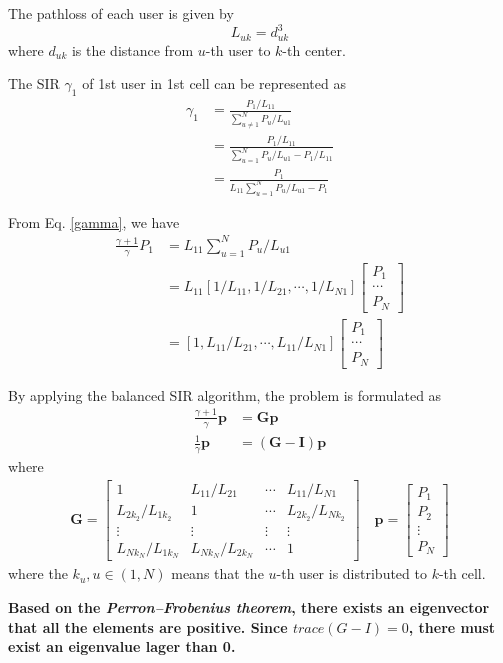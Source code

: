 \documentclass[12pt]{article}
\begin{document}
The pathloss of each user is given by
\begin{equation}
L_{uk} = d_{uk}^3
\end{equation}
where $d_{uk}$ is the distance from $u$-th user to $k$-th center.

The SIR $\gamma_1$ of 1st user in 1st cell can be represented as
\begin{align}\label{gamma}
	\gamma_1 &= \frac{P_1/L_{11}}{\sum_{u\neq 1}^{N}P_{u}/L_{u1}} \nonumber\\
	&= \frac{P_1/L_{11}}{\sum_{u=1}^{N}P_{u}/L_{u1} - P_1/L_{11}} \nonumber\\
	&= \frac{P_1}{L_{11}\sum_{u=1}^{N}P_{u}/L_{u1} - P_1} 
\end{align}

From Eq. \eqref{gamma}, we have
\begin{align}
\frac{\gamma+1}{\gamma}P_1 &= L_{11}\sum_{u=1}^{N}P_{u}/L_{u1} \\
& = L_{11} 
[1/L_{11}, 1/L_{21},\cdots, 1/L_{N1}]
\begin{bmatrix}
P_{1}\\
\cdots \\
P_{N}
\end{bmatrix}\\
&=[1, L_{11}/L_{21},\cdots, L_{11}/L_{N1}]
\begin{bmatrix}
P_{1}\\
\cdots \\
P_{N}
\end{bmatrix}
\end{align}

By applying the balanced SIR algorithm, the problem is formulated as
\begin{align}
\frac{\gamma+1}{\gamma}\bm{p} &= \bm{G}\bm{p}\\
\frac{1}{\gamma}\bm{p} &= (\bm{G}-\bm{I})\bm{p}
\end{align}
where 
\begin{align}
\bm{G} = 
\begin{bmatrix}
1& L_{11}/L_{21}&\cdots& L_{11}/L_{N1}\\
L_{2k_2}/L_{1k_2}& 1&\cdots& L_{2k_2}/L_{Nk_2}\\
\vdots&\vdots&\vdots&\vdots\\
L_{Nk_N}/L_{1k_N}& L_{Nk_N}/L_{2k_N}&\cdots& 1
\end{bmatrix}
\quad
\bm{p} =
\begin{bmatrix}
P_{1}\\
P_{2}\\
\vdots\\
P_N
\end{bmatrix}
\end{align}
where the $k_u,u\in (1, N)$ means that the $u$-th user is distributed to $k$-th cell.

\textbf{Based on the \textit{Perron–Frobenius theorem}, there exists an eigenvector that all the elements are positive. Since $trace(G-I)=0$, there must exist an eigenvalue lager than 0.}
%
%
\end{document}
